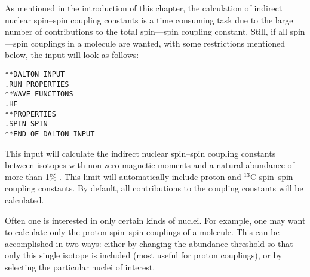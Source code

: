 \begin{center}
\end{center}

As mentioned in the introduction of this chapter, the calculation of
indirect nuclear
spin--spin coupling constants is a time consuming task due to the
large number of contributions to the total spin---spin coupling
constant. Still, if all spin---spin couplings in a molecule are wanted,
with some restrictions mentioned below, the input will look as
follows:

\begin{verbatim}
**DALTON INPUT
.RUN PROPERTIES
**WAVE FUNCTIONS
.HF
**PROPERTIES
.SPIN-SPIN
**END OF DALTON INPUT
\end{verbatim}

This input will calculate the indirect nuclear spin--spin
coupling
constants between isotopes with non-zero magnetic
moments and a
natural abundance of more than 1\% . This limit will
automatically
include proton and $^{13}$C spin--spin coupling constants. By default,
all contributions to the coupling constants will be calculated.

Often one is interested in only certain kinds of nuclei. For example,
 one may want to calculate only the proton spin--spin couplings of a molecule.
This can be accomplished in two ways: either by changing the abundance
threshold so that only this single isotope is included (most useful
for proton couplings), or by selecting the particular nuclei of interest.

